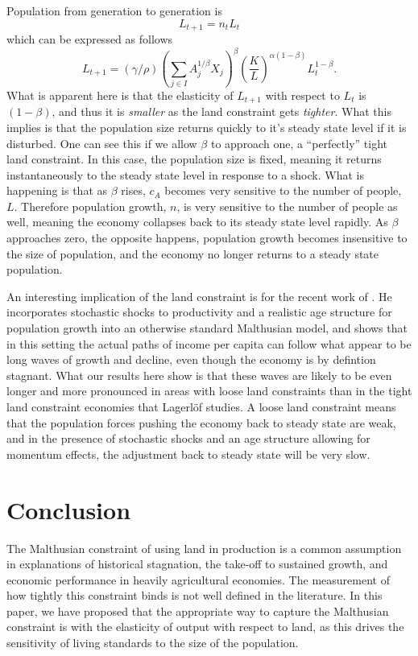 \documentclass[11pt]{article}
\begin{document}
Population from generation to generation is
\begin{equation}
    L_{t+1} = n_t L_t
\end{equation}
which can be expressed as follows
\begin{equation}
    L_{t+1} = (\gamma/\rho) \left(\sum_{j\in I} A_{j}^{1/\beta}X_{j} \right)^\beta \left(\frac{K}{L}\right)^{\alpha(1-\beta)} L_t^{1-\beta}.
\end{equation}
What is apparent here is that the elasticity of $L_{t+1}$ with respect to $L_t$ is $(1-\beta)$, and thus it is \textit{smaller} as the land constraint gets \textit{tighter}. What this implies is that the population size returns quickly to it's steady state level if it is disturbed. One can see this if we allow $\beta$ to approach one, a ``perfectly'' tight land constraint. In this case, the population size is fixed, meaning it returns instantaneously to the steady state level in response to a shock. What is happening is that as $\beta$ rises, $c_A$ becomes very sensitive to the number of people, $L$. Therefore population growth, $n$, is very sensitive to the number of people as well, meaning the economy collapses back to its steady state level rapidly. As $\beta$ approaches zero, the opposite happens, population growth becomes insensitive to the size of population, and the economy no longer returns to a steady state population.

An interesting implication of the land constraint is for the recent work of \citet{lagerlof2016}. He incorporates stochastic shocks to productivity and a realistic age structure for population growth into an otherwise standard Malthusian model, and shows that in this setting the actual paths of income per capita can follow what appear to be long waves of growth and decline, even though the economy is by defintion stagnant. What our results here show is that these waves are likely to be even longer and more pronounced in areas with loose land constraints than in the tight land constraint economies that Lagerl{\"o}f studies. A loose land constraint means that the population forces pushing the economy back to steady state are weak, and in the presence of stochastic shocks and an age structure allowing for momentum effects, the adjustment back to steady state will be very slow. 

\section{Conclusion}
The Malthusian constraint of using land in production is a common assumption in explanations of historical stagnation, the take-off to sustained growth, and economic performance in heavily agricultural economies. The measurement of how tightly this constraint binds is not well defined in the literature. In this paper, we have proposed that the appropriate way to capture the Malthusian constraint is with the elasticity of output with respect to land, as this drives the sensitivity of living standards to the size of the population.
\end{document}
